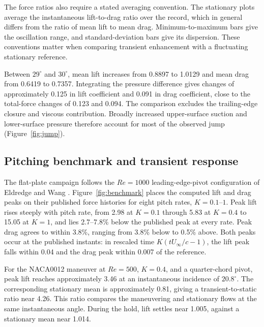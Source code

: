 The force ratios also require a stated averaging convention. The stationary plots average the instantaneous lift-to-drag ratio over the record, which in general differs from the ratio of mean lift to mean drag. Minimum-to-maximum bars give the oscillation range, and standard-deviation bars give its dispersion. These conventions matter when comparing transient enhancement with a fluctuating stationary reference.

Between $29^\circ$ and $30^\circ$, mean lift increases from 0.8897 to 1.0129 and mean drag from 0.6419 to 0.7357. Integrating the pressure difference gives changes of approximately 0.125 in lift coefficient and 0.091 in drag coefficient, close to the total-force changes of 0.123 and 0.094. The comparison excludes the trailing-edge closure and viscous contribution. Broadly increased upper-surface suction and lower-surface pressure therefore account for most of the observed jump (Figure~\ref{fig:jump}).


\subsection{Pitching benchmark and transient response}
The flat-plate campaign follows the $Re=1000$ leading-edge-pivot configuration of Eldredge and Wang \cite{eldredge2010}. Figure~\ref{fig:benchmark} places the computed lift and drag peaks on their published force histories for eight pitch rates, $K=0.1$--$1$. Peak lift rises steeply with pitch rate, from 2.98 at $K=0.1$ through 5.83 at $K=0.4$ to 15.05 at $K=1$, and lies 2.7--7.8\% below the published peak at every rate. Peak drag agrees to within 3.8\%, ranging from 3.8\% below to 0.5\% above. Both peaks occur at the published instants: in rescaled time $K(tU_\infty/c-1)$, the lift peak falls within 0.04 and the drag peak within 0.007 of the reference.


For the NACA0012 maneuver at $Re=500$, $K=0.4$, and a quarter-chord pivot, peak lift reaches approximately 3.46 at an instantaneous incidence of $20.8^\circ$. The corresponding stationary mean is approximately 0.81, giving a transient-to-static ratio near 4.26. This ratio compares the maneuvering and stationary flows at the same instantaneous angle. During the hold, lift settles near 1.005, against a stationary mean near 1.014.

